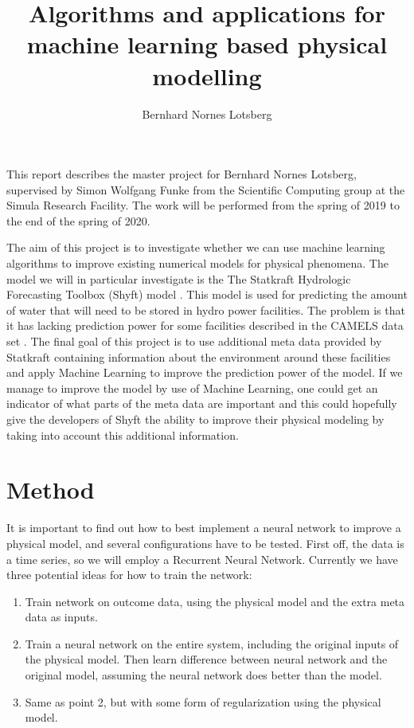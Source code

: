 \documentclass[a4paper,12pt,english]{article}
\title{Algorithms and applications for machine learning based physical modelling}
\author{Bernhard Nornes Lotsberg}
\begin{document}
\maketitle
This report describes the master project for Bernhard Nornes Lotsberg, supervised by Simon Wolfgang Funke from the Scientific Computing group at the Simula Research Facility. The work will be performed from the spring of 2019 to the end of the spring of 2020.

The aim of this project is to investigate whether we can use machine learning algorithms to improve existing numerical models for physical phenomena. The model we will in particular investigate is the The Statkraft Hydrologic Forecasting Toolbox (Shyft) model \cite{burkhart2016operational}. This model is used for predicting the amount of water that will need to be stored in hydro power facilities. The problem is that it has lacking prediction power for some facilities described in the CAMELS data set \cite{newman2014large}.
 The final goal of this project is to use additional meta data provided by Statkraft containing information about the environment around these facilities and apply Machine Learning to improve the prediction power of the model. If we manage to improve the model by use of Machine Learning, one could get an indicator of what parts of the meta data are important and this could hopefully give the developers of Shyft the ability to improve their physical modeling by taking into account this additional information.
 
 \section{Method}
 It is important to find out how to best implement a neural network to improve a physical model, and several configurations have to be tested. First off, the data is a time series, so we will employ a Recurrent Neural Network. Currently we have three potential ideas for how to train the network:
 \begin{enumerate}
 \item Train network on outcome data, using the physical model and the extra meta data as inputs.
 \item Train a neural network on the entire system, including the original inputs of the physical model. Then learn difference between neural network and the original model, assuming the neural network does better than the model.
 \item Same as point 2, but with some form of regularization using the physical model.
 \end{enumerate}
 
\end{document}
